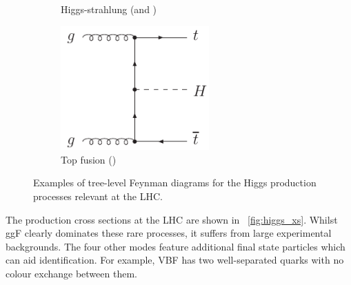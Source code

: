 \begin{figure}[b]
\begin{subfigure}[b]{0.4\textwidth}
		\caption{Higgs-strahlung (\WH and \ZH)}
		\label{fig:feyn:VH}
	\end{subfigure}
	\hfill
	\begin{subfigure}[b]{0.4\textwidth}
		\centering
		\includegraphics[width=0.625\textwidth]{axodraw/ttH.pdf}
		\caption{Top fusion (\ttH)}
		\label{fig:feyn:ttH}
	\end{subfigure}
	\hfill\null
	\caption{Examples of tree-level Feynman diagrams for the Higgs production processes relevant at the \ac{LHC}.}
	\label{fig:feyn}
\end{figure}

The production cross sections at the \acs{LHC} are shown in \Figure~\ref{fig:higgs_xs}. 
Whilst \ac{ggF} clearly dominates these rare processes, it suffers from large 
experimental backgrounds. The four other modes feature additional final state particles 
which can aid identification. For example, \ac{VBF} has two well-separated quarks with no 
colour exchange between them.

